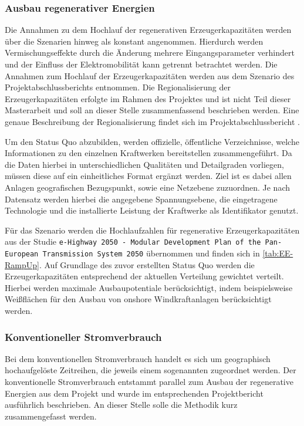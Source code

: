 \subsubsection{Ausbau regenerativer Energien}

Die Annahmen zu dem Hochlauf der regenerativen Erzeugerkapazitäten werden über die Szenarien hinweg als konstant angenommen.
Hierdurch werden Vermischungseffekte durch die Änderung mehrere Eingangsparameter verhindert und der Einfluss der Elektromobilität kann getrennt betrachtet werden.
Die Annahmen zum Hochlauf der Erzeugerkapazitäten werden aus dem Szenario \ego des \openego Projektabschlussberichts \cite{Mueller2019} entnommen.
Die Regionalisierung der Erzeugerkapazitäten erfolgte im Rahmen des \openego Projektes und ist nicht Teil dieser Masterarbeit und soll an dieser Stelle zusammenfassend beschrieben werden.
Eine genaue Beschreibung der Regionalisierung findet sich im \openego Projektabschlussbericht \cite{Mueller2019}.\medskip

Um den Status Quo abzubilden, werden offizielle, öffentliche Verzeichnisse, welche Informationen zu den einzelnen Kraftwerken bereitstellen zusammengeführt.
Da die Daten hierbei in unterschiedlichen Qualitäten und Detailgraden vorliegen, müssen diese auf ein einheitliches Format ergänzt werden.
Ziel ist es dabei allen Anlagen geografischen Bezugspunkt, sowie eine Netzebene zuzuordnen.
Je nach Datensatz werden hierbei die angegebene Spannungsebene, die eingetragene Technologie und die installierte Leistung der Kraftwerke als Identifikator genutzt.\medskip

Für das Szenario \ego werden die Hochlaufzahlen für regenerative Erzeugerkapazitäten aus der Studie \texttt{e-Highway 2050 - Modular Development Plan of the Pan-European Transmission System 2050} \cite{EEHPG2015} übernommen und finden sich in \autoref{tab:EE-RampUp}.
Auf Grundlage des zuvor erstellten Status Quo werden die Erzeugerkapazitäten entsprechend der aktuellen Verteilung gewichtet verteilt.
Hierbei werden maximale Ausbaupotentiale berücksichtigt, indem beispielsweise Weißflächen für den Ausbau von onshore Windkraftanlagen berücksichtigt werden.




\subsubsection{Konventioneller Stromverbrauch}

Bei dem konventionellen Stromverbrauch handelt es sich um geographisch hochaufgelöste Zeitreihen, die jeweils einem sogenannten \Lastgebiet zugeordnet werden.
Der konventionelle Stromverbrauch entstammt parallel zum Ausbau der regenerative Energien aus dem \openego Projekt und wurde im entsprechenden Projektbericht \cite{Mueller2019} ausführlich beschrieben.
An dieser Stelle solle die Methodik kurz zusammengefasst werden.\medskip

